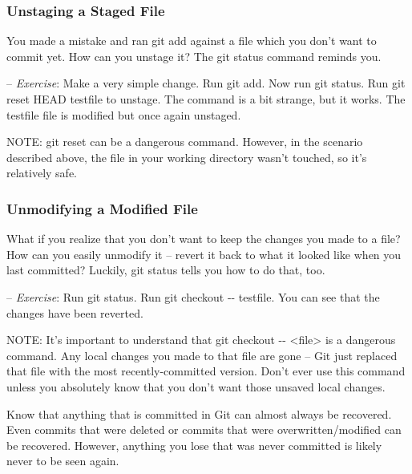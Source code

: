 \documentclass[12pt,a4]{article}
\newcommand{\ilcode}[1]{\textcolor[RGB]{160, 110, 220}{#1}}
\begin{document}
\subsubsection{Unstaging a Staged File}
You made a mistake and ran \ilcode{git add} against a file which you don't want
to commit yet. How can you unstage it? The \ilcode{git status} command reminds
you.

{\sf -- \emph{Exercise}:} Make a very simple change. Run \ilcode{git add}. Now
run \ilcode{git status}. Run \ilcode{git reset HEAD testfile} to unstage. The
command is a bit strange, but it works. The testfile file is modified but once
again unstaged.

{\sf NOTE:} \ilcode{git reset} can be a dangerous command. However, in the
scenario described above, the file in your working directory wasn't touched, so
it’s relatively safe.

\subsubsection{Unmodifying a Modified File}
What if you realize that you don’t want to keep the changes you made to a file?
How can you easily unmodify it -- revert it back to what it looked like when you
last committed? Luckily, \ilcode{git status} tells you how to do that, too.

{\sf -- \emph{Exercise}:} Run \ilcode{git status}. Run \ilcode{git checkout -{}-
testfile}. You can see that the changes have been reverted.

{\sf NOTE:} It’s important to understand that \ilcode{git checkout -{}- <file>}
is a dangerous command. Any local changes you made to that file are gone -- Git
just replaced that file with the most recently-committed version. Don’t ever use
this command unless you absolutely know that you don’t want those unsaved local
changes.

Know that anything that is committed in Git can almost always be recovered. Even
commits that were deleted or commits that were overwritten/modified can be
recovered. However, anything you lose that was never committed is likely never
to be seen again.
\end{document}

